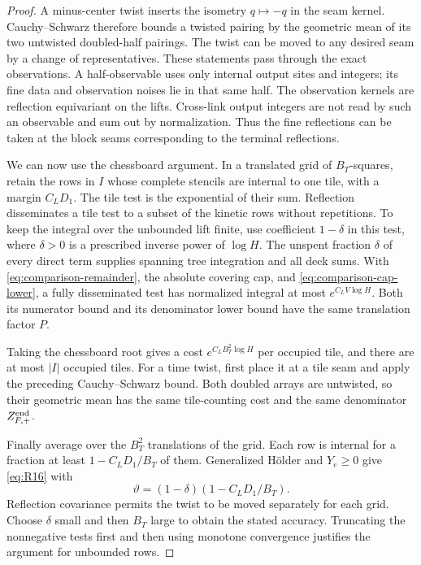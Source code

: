 \begin{proof}
A minus-center twist inserts the isometry \(q\mapsto-q\) in the seam
kernel.  Cauchy--Schwarz therefore bounds a twisted pairing by the
geometric mean of its two untwisted doubled-half pairings.  The twist
can be moved to any desired seam by a change of representatives.
These statements pass through the exact observations.  A half-observable
uses only internal output sites and integers; its fine data and
observation noises lie in that same half.  The observation kernels are
reflection equivariant on the lifts.  Cross-link output integers are
not read by such an observable and sum out by normalization.  Thus the
fine reflections can be taken at the block seams corresponding to the
terminal reflections.

We can now use the chessboard argument.  In a translated grid of
\(B_T\)-squares, retain the rows in \(I\) whose complete stencils are
internal to one tile, with a margin \(C_LD_1\).  The tile test is the
exponential of their sum.  Reflection disseminates a tile test to a
subset of the kinetic rows without repetitions.  To keep the integral
over the unbounded lift finite, use coefficient \(1-\delta\) in this
test, where \(\delta>0\) is a prescribed inverse power of \(\log H\).
The unspent fraction \(\delta\) of every direct term supplies spanning
tree integration and all deck sums.  With
\eqref{eq:comparison-remainder}, the absolute covering cap, and
\eqref{eq:comparison-cap-lower}, a fully disseminated test has normalized
integral at most \(e^{C_LV\log H}\).  Both its numerator bound and its
denominator lower bound have the same translation factor \(P\).

Taking the chessboard root gives a cost
\(e^{C_LB_T^2\log H}\) per occupied tile, and there are at most
\(|I|\) occupied tiles.  For a time twist, first place it at a tile seam
and apply the preceding Cauchy--Schwarz bound.  Both doubled arrays are
untwisted, so their geometric mean has the same tile-counting cost and
the same denominator \(Z_{F,+}^{\rm end}\).

Finally average over the \(B_T^2\) translations of the grid.  Each row
is internal for a fraction at least \(1-C_LD_1/B_T\) of them.
Generalized H\"older and \(Y_e\ge0\) give \eqref{eq:R16} with
\[
 \vartheta=(1-\delta)(1-C_LD_1/B_T).
\]
Reflection covariance permits the twist to be moved separately for
each grid.  Choose \(\delta\) small and then \(B_T\) large to obtain
the stated accuracy.  Truncating the nonnegative tests first and then
using monotone convergence justifies the argument for unbounded rows.
\end{proof}


